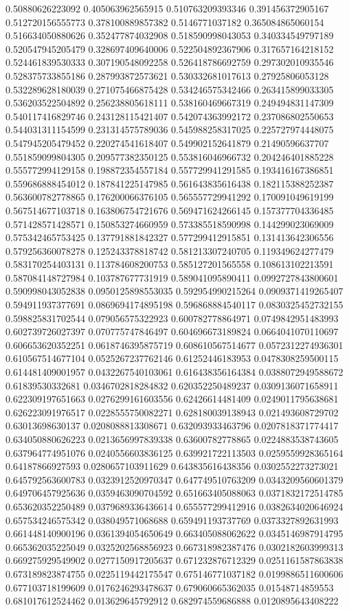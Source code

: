 \begin{table}
\begin{tabu}
\begin{sparkline}{10}
0.50880626223092 0.405063962565915 0.510763209393346 0.391456372905167 0.512720156555773 0.378100889857382 0.5146771037182 0.365084865060154 0.516634050880626 0.352477874032908 0.518590998043053 0.340334549797189 0.520547945205479 0.328697409640006 0.522504892367906 0.317657164218152 0.524461839530333 0.307190548092258 0.526418786692759 0.297302010935546 0.528375733855186 0.287993872573621 0.530332681017613 0.27925806053128 0.532289628180039 0.271075466875428 0.534246575342466 0.263415899033305 0.536203522504892 0.256238805618111 0.538160469667319 0.249494831147309 0.540117416829746 0.243128115421407 0.542074363992172 0.237086802550653 0.544031311154599 0.231314575789036 0.545988258317025 0.225727974448075 0.547945205479452 0.220274541618407 0.549902152641879 0.21490596637707 0.551859099804305 0.209577382350125 0.553816046966732 0.204246401885228 0.555772994129158 0.198872354557184 0.557729941291585 0.193416167386851 0.559686888454012 0.187841225147985 0.561643835616438 0.182115388252387 0.563600782778865 0.176200066376105 0.565557729941292 0.170091049619199 0.567514677103718 0.163806754721676 0.569471624266145 0.157377704336485 0.571428571428571 0.150853274660959 0.573385518590998 0.144299023069009 0.575342465753425 0.137791881842327 0.577299412915851 0.131413642306556 0.579256360078278 0.125243378818742 0.581213307240705 0.119349624277479 0.583170254403131 0.113784608200753 0.585127201565558 0.108613102213591 0.587084148727984 0.103787677731919 0.589041095890411 0.0992727843800601 0.590998043052838 0.0950125898553035 0.592954990215264 0.0909371419265407 0.594911937377691 0.0869694174895198 0.596868884540117 0.0830325452732155 0.598825831702544 0.079056575322923 0.600782778864971 0.0749842951483993 0.602739726027397 0.070775747846497 0.604696673189824 0.0664041070110697 0.606653620352251 0.0618746395875719 0.608610567514677 0.0572312274936301 0.610567514677104 0.0525267237762146 0.61252446183953 0.0478308259500115 0.614481409001957 0.0432267540103061 0.616438356164384 0.0388072949588672 0.61839530332681 0.0346702818284832 0.620352250489237 0.0309136071658911 0.622309197651663 0.0276299161603556 0.62426614481409 0.0249011795638681 0.626223091976517 0.0228555750082271 0.628180039138943 0.021493608729702 0.63013698630137 0.0208088813308671 0.632093933463796 0.0207818371774417 0.634050880626223 0.0213656997839338 0.63600782778865 0.0224883538743605 0.637964774951076 0.0240556603836125 0.639921722113503 0.0259559928365164 0.64187866927593 0.0280657103911629 0.643835616438356 0.0302552273273021 0.645792563600783 0.0323912520970347 0.647749510763209 0.0343209560601379 0.649706457925636 0.0359463090704592 0.651663405088063 0.0371832172514785 0.653620352250489 0.0379689336436614 0.655577299412916 0.0382634020646924 0.657534246575342 0.038049571068688 0.659491193737769 0.0373327892631993 0.661448140900196 0.0361394054650649 0.663405088062622 0.0345146987914795 0.665362035225049 0.0325202568856923 0.667318982387476 0.0302182603999313 0.669275929549902 0.0277150917205637 0.671232876712329 0.0251161587863838 0.673189823874755 0.0225119442175547 0.675146771037182 0.0199886511600606 0.677103718199609 0.0176246293478637 0.679060665362035 0.01548714859553 0.681017612524462 0.013629645792912 0.682974559686888 0.0120895643408222 
\end{sparkline}
\end{tabu}
\end{table}
